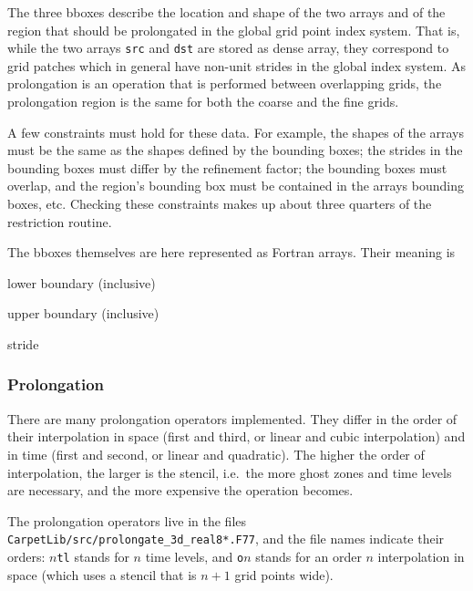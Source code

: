 \documentclass{article}
\begin{document}
   The three bboxes describe the location and shape of the two arrays
   and of the region that should be prolongated in the global grid
   point index system.  That is, while the two arrays \texttt{src} and
   \texttt{dst} are stored as dense array, they correspond to grid
   patches which in general have non-unit strides in the global index
   system.  As prolongation is an operation that is performed between
   overlapping grids, the prolongation region is the same for both the
   coarse and the fine grids.

   A few constraints must hold for these data.  For example, the
   shapes of the arrays must be the same as the shapes defined by the
   bounding boxes; the strides in the bounding boxes must differ by
   the refinement factor; the bounding boxes must overlap, and the
   region's bounding box must be contained in the arrays bounding
   boxes, etc.  Checking these constraints makes up about three
   quarters of the restriction routine.

   The bboxes themselves are here represented as Fortran arrays.
   Their meaning is
\begin{description}
\itemsep 0pt
\item[\texttt{bbox(:,1)}]
   lower boundary (inclusive)
\item[\texttt{bbox(:,2)}]
   upper boundary (inclusive)
\item[\texttt{bbox(:,3)}]
   stride
\end{description}



\subsubsection{Prolongation}

   There are many prolongation operators implemented.  They differ in
   the order of their interpolation in space (first and third, or
   linear and cubic interpolation) and in time (first and second, or
   linear and quadratic).  The higher the order of interpolation, the
   larger is the stencil, i.e.\ the more ghost zones and time levels
   are necessary, and the more expensive the operation becomes.

   The prolongation operators live in the files
   \texttt{CarpetLib/src/prolongate\_3d\_real8*.F77}, and the file
   names indicate their orders: \texttt{$n$tl} stands for $n$ time
   levels, and \texttt{o$n$} stands for an order $n$ interpolation in
   space (which uses a stencil that is $n+1$ grid points wide).
\end{document}
